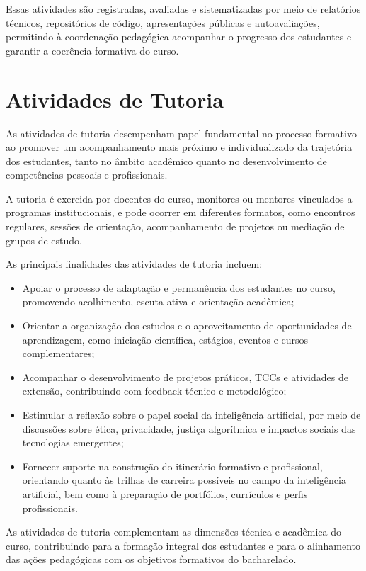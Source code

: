 Essas atividades são registradas, avaliadas e sistematizadas por meio de relatórios técnicos, repositórios de código, apresentações públicas e autoavaliações, permitindo à coordenação pedagógica acompanhar o progresso dos estudantes e garantir a coerência formativa do curso.

\section{Atividades de Tutoria}

As atividades de tutoria desempenham papel fundamental no processo formativo ao promover um acompanhamento mais próximo e individualizado da trajetória dos estudantes, tanto no âmbito acadêmico quanto no desenvolvimento de competências pessoais e profissionais.

A tutoria é exercida por docentes do curso, monitores ou mentores vinculados a programas institucionais, e pode ocorrer em diferentes formatos, como encontros regulares, sessões de orientação, acompanhamento de projetos ou mediação de grupos de estudo.

As principais finalidades das atividades de tutoria incluem:

\begin{itemize}
\item Apoiar o processo de adaptação e permanência dos estudantes no curso, promovendo acolhimento, escuta ativa e orientação acadêmica;
\item Orientar a organização dos estudos e o aproveitamento de oportunidades de aprendizagem, como iniciação científica, estágios, eventos e cursos complementares;
\item Acompanhar o desenvolvimento de projetos práticos, TCCs e atividades de extensão, contribuindo com feedback técnico e metodológico;
\item Estimular a reflexão sobre o papel social da inteligência artificial, por meio de discussões sobre ética, privacidade, justiça algorítmica e impactos sociais das tecnologias emergentes;
\item Fornecer suporte na construção do itinerário formativo e profissional, orientando quanto às trilhas de carreira possíveis no campo da inteligência artificial, bem como à preparação de portfólios, currículos e perfis profissionais.
\end{itemize}

As atividades de tutoria complementam as dimensões técnica e acadêmica do curso, contribuindo para a formação integral dos estudantes e para o alinhamento das ações pedagógicas com os objetivos formativos do bacharelado.
